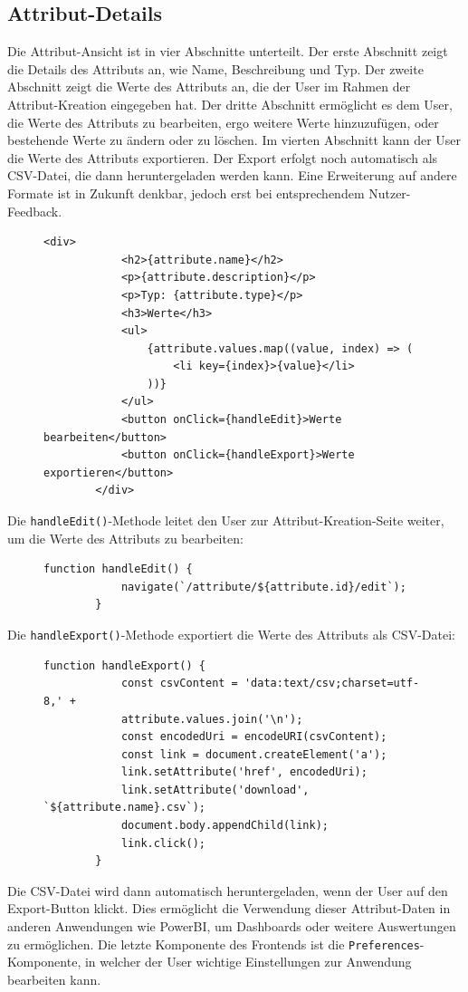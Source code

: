 \subsection{Attribut-Details}
Die Attribut-Ansicht ist in vier Abschnitte unterteilt. Der erste Abschnitt zeigt die Details des Attributs an, wie Name, Beschreibung und Typ.
Der zweite Abschnitt zeigt die Werte des Attributs an, die der User im Rahmen der Attribut-Kreation eingegeben hat. Der dritte Abschnitt ermöglicht es dem User,
die Werte des Attributs zu bearbeiten, ergo weitere Werte hinzuzufügen, oder bestehende Werte zu ändern oder zu löschen.
Im vierten Abschnitt kann der User die Werte des Attributs exportieren. Der Export erfolgt noch automatisch als CSV-Datei, die dann heruntergeladen werden kann.
Eine Erweiterung auf andere Formate ist in Zukunft denkbar, jedoch erst bei entsprechendem Nutzer-Feedback.
\begin{figure}[H]
    \begin{lstlisting}[caption=Attribut-Details, label=list:attributeDetails]
        <div>
            <h2>{attribute.name}</h2>
            <p>{attribute.description}</p>
            <p>Typ: {attribute.type}</p>
            <h3>Werte</h3>
            <ul>
                {attribute.values.map((value, index) => (
                    <li key={index}>{value}</li>
                ))}
            </ul>
            <button onClick={handleEdit}>Werte bearbeiten</button>
            <button onClick={handleExport}>Werte exportieren</button>
        </div>
    \end{lstlisting}
\end{figure}
Die \texttt{handleEdit()}-Methode leitet den User zur Attribut-Kreation-Seite weiter, um die Werte des Attributs zu bearbeiten:
\begin{figure}[H]
    \begin{lstlisting}[caption=Attribut-Details, label=list:attributeDetails2]
        function handleEdit() {
            navigate(`/attribute/${attribute.id}/edit`);
        }
    \end{lstlisting}
\end{figure}
Die \texttt{handleExport()}-Methode exportiert die Werte des Attributs als CSV-Datei:
\begin{figure}[H]
    \begin{lstlisting}[caption=Attribut-Details, label=list:attributeDetails3]
        function handleExport() {
            const csvContent = 'data:text/csv;charset=utf-8,' + 
            attribute.values.join('\n');
            const encodedUri = encodeURI(csvContent);
            const link = document.createElement('a');
            link.setAttribute('href', encodedUri);
            link.setAttribute('download', `${attribute.name}.csv`);
            document.body.appendChild(link);
            link.click();
        }
    \end{lstlisting}
\end{figure}
Die CSV-Datei wird dann automatisch heruntergeladen, wenn der User auf den Export-Button klickt. Dies ermöglicht die Verwendung dieser Attribut-Daten in anderen
Anwendungen wie PowerBI, um Dashboards oder weitere Auswertungen zu ermöglichen.
Die letzte Komponente des Frontends ist die \texttt{Preferences}-Komponente, in welcher der User wichtige Einstellungen zur Anwendung bearbeiten kann.
